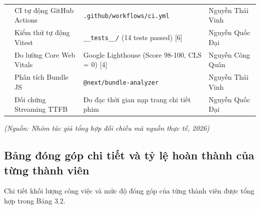\documentclass[13pt,a4paper]{extarticle}
\begin{document}
\begin{table}[H]
\begin{tabularx}{\textwidth}{>{\raggedright\arraybackslash}p{2cm}>{\raggedright\arraybackslash}p{3.8cm}>{\raggedright\arraybackslash}X>{\raggedright\arraybackslash}p{3.2cm}}
  & CI tự động GitHub Actions & \texttt{.github/}\allowbreak\texttt{workflows/}\allowbreak\texttt{ci.yml} & Nguyễn Thái Vinh \\
  & Kiểm thử tự động Vitest & \texttt{\_\_tests\_\_/} (14 tests passed) [6] & Nguyễn Quốc Đại \\
\midrule
\multirow{3}{*}{\textbf{Tầng 3} \newline (Đo lường)} 
  & Đo lường Core Web Vitals & Google Lighthouse (Score 98-100, CLS = 0) [4] & Nguyễn Công Quân \\
  & Phân tích Bundle JS & \texttt{@next/bundle-analyzer} & Nguyễn Thái Vinh \\
  & Đối chứng Streaming TTFB & Đo đạc thời gian nạp trang chi tiết phim & Nguyễn Quốc Đại \\
\bottomrule
\end{tabularx}
\end{table}
\begin{flushleft}\small\textit{(Nguồn: Nhóm tác giả tổng hợp đối chiếu mã nguồn thực tế, 2026)}\end{flushleft}

\subsection{Bảng đóng góp chi tiết và tỷ lệ hoàn thành của từng thành viên}
Chi tiết khối lượng công việc và mức độ đóng góp của từng thành viên được tổng hợp trong Bảng 3.2.
\end{document}
